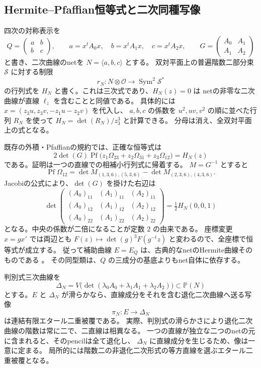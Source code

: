 \subsection{Hermite--Pfaffian恒等式と二次同種写像}
\label{subsec:notes-hermite-v27}

四次の対称表示を
\[
 Q=\begin{pmatrix}a&b\\b&c\end{pmatrix},\qquad
 a=x^tA_0x,\quad b=x^tA_1x,\quad c=x^tA_2x,
 \qquad G=\begin{pmatrix}A_0&A_1\\A_1&A_2\end{pmatrix}
\]
と書き、二次曲線のnetを $N=\langle a,b,c\rangle$ とする。
双対平面上の普遍階数二部分束 $\mathcal S$ に対する制限
\[
 r_N:N\otimes\mathcal O\longrightarrow\operatorname{Sym}^2\mathcal S^*
\]
の行列式を $H_N$ と書く。これは三次式であり、$H_N(z)=0$ は
netの非零な二次曲線が直線 $\ell_z$ を含むことと同値である。
具体的には $x=(z_3u,z_3v,-z_1u-z_2v)$ を代入し、
$a,b,c$ の係数を $u^2,uv,v^2$ の順に並べた行列 $R_N$ を使って
$H_N=\det(R_N)/z_3^3$ と計算できる。
分母は消え、全双対平面上の式となる。

既存の外積・Pfaffianの規約では、正確な恒等式は
\begin{equation}\label{eq:notes-hermite-pfaffian-v27}
 2\det(G)\operatorname{Pf}\bigl(z_1\Omega_{23}+z_2\Omega_{31}+z_3\Omega_{12}\bigr)
 =H_N(z)
\end{equation}
である。証明は一つの直線での相補小行列式に帰着する。
$M=G^{-1}$ とすると
\[
 \operatorname{Pf}\Omega_{12}
 =\det M_{(1,3,6),(5,3,6)}-\det M_{(2,3,6),(4,3,6)}.
\]
Jacobiの公式により、$\det(G)$ を掛けた右辺は
\[
 \det\begin{pmatrix}
 (A_0)_{11}&(A_1)_{11}&(A_2)_{11}\\
 (A_0)_{12}&(A_1)_{12}&(A_2)_{12}\\
 (A_0)_{22}&(A_1)_{22}&(A_2)_{22}
 \end{pmatrix}=\tfrac12 H_N(0,0,1)
\]
となる。中央の係数が二倍になることが定数 $2$ の由来である。
座標変更 $x=gx'$ では両辺とも
$F(z)\mapsto\det(g)^3F(g^{-t}z)$ と変わるので、全座標で恒等式が成立する。
従って補助曲線 $E=E_Q$ は、古典的なnetのHermite曲線そのものである
\cite[著者公開原稿 \S3.2.2, Exercise 3.12]{DolgachevCAG}。
その同型類は、$Q$ の三成分の基底よりもnet自体に依存する。

判別式三次曲線を
\[
 \Delta_N=V\bigl(\det(\lambda_0A_0+\lambda_1A_1+\lambda_2A_2)\bigr)
 \subset\mathbb P(N)
\]
とする。$E$ と $\Delta_N$ が滑らかなら、直線成分をそれを含む退化二次曲線へ送る写像
\[
 \pi_N:E\longrightarrow\Delta_N
\]
は連結有限エタール二重被覆である。
実際、判別式の滑らかさにより退化二次曲線の階数は常に二で、二直線は相異なる。
一つの直線が独立な二つのnetの元に含まれると、そのpencilは全て退化し、
$\Delta_N$ に直線成分を生じるため、像は一意に定まる。
局所的には階数二の非退化二次形式の等方直線を選ぶエタール二重被覆となる。

